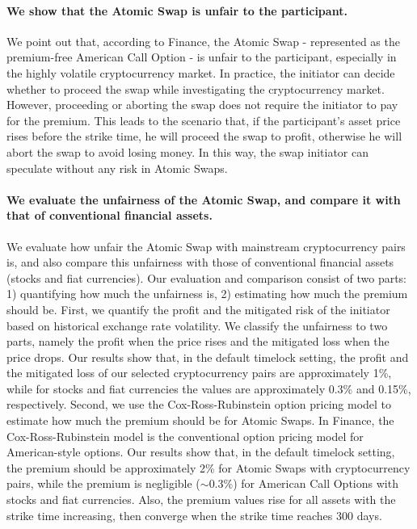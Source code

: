\paragraph{We show that the Atomic Swap is unfair to the participant.}
We point out that, according to Finance, the Atomic Swap - represented as the premium-free American Call Option - is unfair to the participant, especially in the highly volatile cryptocurrency market.
In practice, the initiator can decide whether to proceed the swap while investigating the cryptocurrency market.
However, proceeding or aborting the swap does not require the initiator to pay for the premium.
This leads to the scenario that, if the participant's asset price rises before the strike time, he will proceed the swap to profit, otherwise he will abort the swap to avoid losing money.
In this way, the swap initiator can speculate without any risk in Atomic Swaps.

\paragraph{We evaluate the unfairness of the Atomic Swap, and compare it with that of conventional financial assets.}
We evaluate how unfair the Atomic Swap with mainstream cryptocurrency pairs is, and also compare this unfairness with those of conventional financial assets (stocks and fiat currencies).
Our evaluation and comparison consist of two parts: 1) quantifying how much the unfairness is, 2) estimating how much the premium should be.
First, we quantify the profit and the mitigated risk of the initiator based on historical exchange rate volatility.
We classify the unfairness to two parts, namely the profit when the price rises and the mitigated loss when the price drops.
Our results show that, in the default timelock setting, the profit and the mitigated loss of our selected cryptocurrency pairs are approximately 1\%, while for stocks and fiat currencies the values are approximately 0.3\% and 0.15\%, respectively.
Second, we use the Cox-Ross-Rubinstein option pricing model to estimate how much the premium should be for Atomic Swaps.
In Finance, the Cox-Ross-Rubinstein model\cite{cox1979option} is the conventional option pricing model for American-style options.
Our results show that, in the default timelock setting, the premium should be approximately 2\% for Atomic Swaps with cryptocurrency pairs, while the premium is negligible ($\sim 0.3\%$) for American Call Options with stocks and fiat currencies.
Also, the premium values rise for all assets with the strike time increasing, then converge when the strike time reaches 300 days.

